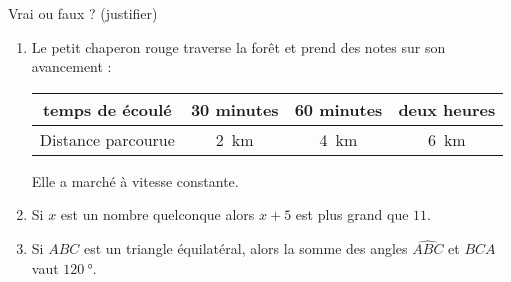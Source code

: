 
\begin{exercice}\label{exo2smath-0251}

    Vrai ou faux ? (justifier)
    \begin{enumerate}
        \item
            Le petit chaperon rouge traverse la forêt et prend des notes sur son avancement :
            \begin{center}
                \begin{tabular}[]{|c||c|c|c|}
                    \hline
                    temps de écoulé&30 minutes&60 minutes&deux heures\\
                    \hline
                    Distance parcourue&\SI{2}{\kilo\meter}&\SI{4}{\kilo\meter}&\SI{6}{\kilo\meter}\\ 
                    \hline
                \end{tabular}
            \end{center}
            Elle a marché à vitesse constante.
        \item
            Si \( x\) est un nombre quelconque alors \( x+5\) est plus grand que \( 11\).
        \item
            Si \( ABC\) est un triangle équilatéral, alors la somme des angles \( \widehat{ABC}\) et \( \widehat{BCA}\) vaut \(\SI{120}{\degree}\).
    \end{enumerate}

\end{exercice}
